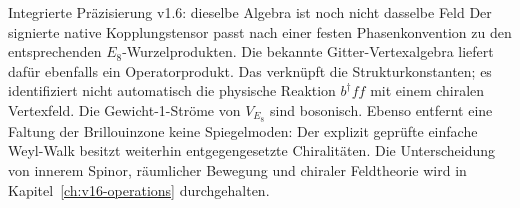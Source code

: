 \begin{grenze}{Integrierte Präzisierung v1.6: dieselbe Algebra ist noch nicht dasselbe Feld}
Der signierte native Kopplungstensor passt nach einer festen Phasenkonvention zu den entsprechenden $E_8$-Wurzelprodukten. Die bekannte Gitter-Vertexalgebra liefert dafür ebenfalls ein Operatorprodukt. Das verknüpft die Strukturkonstanten; es identifiziert nicht automatisch die physische Reaktion $b^\dagger ff$ mit einem chiralen Vertexfeld. Die Gewicht-1-Ströme von $V_{E_8}$ sind bosonisch. Ebenso entfernt eine Faltung der Brillouinzone keine Spiegelmoden: Der explizit geprüfte einfache Weyl-Walk besitzt weiterhin entgegengesetzte Chiralitäten. Die Unterscheidung von innerem Spinor, räumlicher Bewegung und chiraler Feldtheorie wird in Kapitel~\ref{ch:v16-operations} durchgehalten.
\end{grenze}
